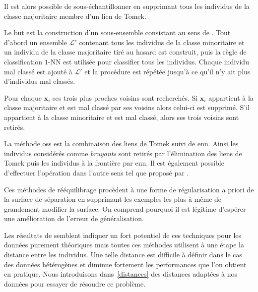 Il est alors possible de sous-échantillonner en supprimant tous les individus de la classe majoritaire membre d'un lien de Tomek.

\begin{definition}
    Le but est la construction d'un sous-ensemble consistant au sens de \citet{Hart1968}. Tout d'abord un ensemble $\mathcal{L'}$ contenant tous les individus de la classe minoritaire et un individu de la classe majoritaire tiré au hasard est construit, puis la règle de classification $1$-NN est utilisée pour classifier tous les individus. Chaque individu mal classé est ajouté à $\mathcal{L'}$ et la procédure est répétée jusqu'à ce qu'il n'y ait plus d'individus mal classés.
\end{definition}

\begin{definition}
    Pour chaque $\mathbf{x}_i$ ses trois plus proches voisins sont recherchés. Si $\mathbf{x}_i$ appartient à la classe majoritaire et est mal classé par ses voisins alors celui-ci est supprimé. S'il appartient à la classe minoritaire et est mal classé, alors ses trois voisins sont retirés.
\end{definition}

\begin{definition}
    La méthode \ac{oss} est la combinaison des liens de Tomek suivi de \ac{enn}. Ainsi les individus considérés comme \emph{bruyants} sont retirés par l'élimination des liens de Tomek puis les individus à la frontière par \ac{enn}. Il est également possible d'effectuer l'opération dans l'autre sens tel que proposé par \citet{Batista2004}.
\end{definition}

Ces méthodes de rééquilibrage procèdent à une forme de régularisation a priori de la surface de séparation en supprimant les exemples les plus à même de grandement modifier la surface. On comprend pourquoi il est légitime d'espérer une amélioration de l'erreur de généralisation.

Les résultats de \citet{Chen2004,Japkowicz2000} semblent indiquer un fort potentiel de ces techniques pour les données purement théoriques mais toutes ces méthodes utilisent à une étape la distance entre les individus. Une telle distance est difficile à définir dans le cas des données hétérogènes et diminue fortement les performances que l'on obtient en pratique. Nous introduisons dans~\ref{distances} des distances adaptées à nos données pour essayer de résoudre ce problème.

